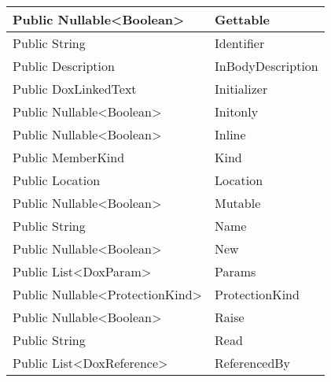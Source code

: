 \documentclass[11pt, oneside, a4paper]{book}
\begin{document}
\begin{center}
\begin{tabular}{| p{3cm} | p{12cm} | }
\hline
 Public  Nullable<Boolean> &  Gettable\hypertarget{SoftwareEngineeringTools.{}Documentation.{}DoxField.{}Gettable}{}\\
\hline
 Public  String &  Identifier\hypertarget{SoftwareEngineeringTools.{}Documentation.{}DoxField.{}Identifier}{}\\
\hline
 Public  Description &  InBodyDescription\hypertarget{SoftwareEngineeringTools.{}Documentation.{}DoxField.{}InBodyDescription}{}\\
\hline
 Public  DoxLinkedText &  Initializer\hypertarget{SoftwareEngineeringTools.{}Documentation.{}DoxField.{}Initializer}{}\\
\hline
 Public  Nullable<Boolean> &  Initonly\hypertarget{SoftwareEngineeringTools.{}Documentation.{}DoxField.{}Initonly}{}\\
\hline
 Public  Nullable<Boolean> &  Inline\hypertarget{SoftwareEngineeringTools.{}Documentation.{}DoxField.{}Inline}{}\\
\hline
 Public  MemberKind &  Kind\hypertarget{SoftwareEngineeringTools.{}Documentation.{}DoxField.{}Kind}{}\\
\hline
 Public  Location &  Location\hypertarget{SoftwareEngineeringTools.{}Documentation.{}DoxField.{}Location}{}\\
\hline
 Public  Nullable<Boolean> &  Mutable\hypertarget{SoftwareEngineeringTools.{}Documentation.{}DoxField.{}Mutable}{}\\
\hline
 Public  String &  Name\hypertarget{SoftwareEngineeringTools.{}Documentation.{}DoxField.{}Name}{}\\
\hline
 Public  Nullable<Boolean> &  New\hypertarget{SoftwareEngineeringTools.{}Documentation.{}DoxField.{}New}{}\\
\hline
 Public  List<DoxParam> &  Params\hypertarget{SoftwareEngineeringTools.{}Documentation.{}DoxField.{}Params}{}\\
\hline
 Public  Nullable<ProtectionKind> &  ProtectionKind\hypertarget{SoftwareEngineeringTools.{}Documentation.{}DoxField.{}ProtectionKind}{}\\
\hline
 Public  Nullable<Boolean> &  Raise\hypertarget{SoftwareEngineeringTools.{}Documentation.{}DoxField.{}Raise}{}\\
\hline
 Public  String &  Read\hypertarget{SoftwareEngineeringTools.{}Documentation.{}DoxField.{}Read}{}\\
\hline
 Public  List<DoxReference> &  ReferencedBy\hypertarget{SoftwareEngineeringTools.{}Documentation.{}DoxField.{}ReferencedBy}{}\\

\end{tabular}
\end{center}
\end{document}
